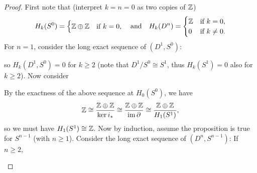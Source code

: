 \begin{proof}
  First note that (interpret $k = n = 0$ as
  two copies of $\mathbb{Z}$)
  \[
    H_k(S^0) =
    \begin{cases}
      \mathbb{Z} \oplus \mathbb{Z} & \text{if } k = 0, \\
    \end{cases}
    \quad \text{and} \quad
    H_k(D^n) =
    \begin{cases}
      \mathbb{Z} & \text{if } k = 0, \\
      0 & \text{if $k \ne 0$}.
    \end{cases}
  \]
  For $n = 1$, consider the long exact sequence of
  $(D^1, S^0)$:
  \begin{center}
  \end{center}
  so $H_k(D^1, S^0) = 0$ for $k \ge 2$ (note that
  $D^1 / S^0 \cong S^1$, thus $H_k(S^1) = 0$ also
  for $k \ge 2$). Now consider
  \begin{center}
  \end{center}
  By the exactness of the above sequence at $H_0(S^0)$,
  we have
  \[
    \mathbb{Z} \cong \frac{\mathbb{Z} \oplus \mathbb{Z}}{\ker i_*}
    \cong \frac{\mathbb{Z} \oplus \mathbb{Z}}{\operatorname{im} \partial}
    \cong \frac{\mathbb{Z} \oplus \mathbb{Z}}{H_1(S^1)},
  \]
  so we must have $H_1(S^1) \cong \mathbb{Z}$.
  Now by induction, assume the proposition is
  true for $S^{n - 1}$ (with $n \ge 1$). Consider
  the long exact sequence of $(D^n, S^{n - 1})$:
  If $n \ge 2$,
  \begin{center}
  \end{center}

\end{proof}
